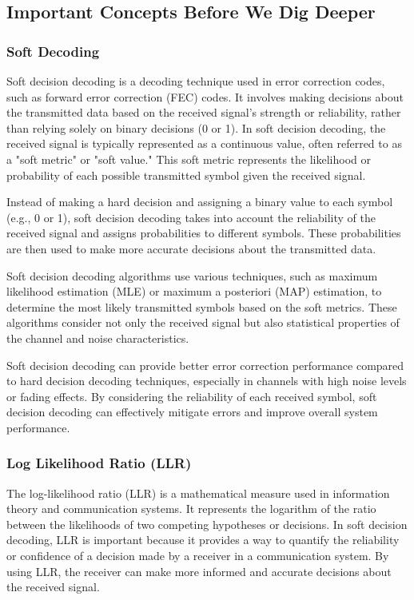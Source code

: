 \subsection{Important Concepts Before We Dig Deeper}
\subsubsection{Soft Decoding}
Soft decision decoding is a decoding technique used in error correction codes, such as forward error correction (FEC) codes. It involves making decisions about the transmitted data based on the received signal's strength or reliability, rather than relying solely on binary decisions (0 or 1).
In soft decision decoding, the received signal is typically represented as a continuous value, often referred to as a "soft metric" or "soft value." This soft metric represents the likelihood or probability of each possible transmitted symbol given the received signal.

Instead of making a hard decision and assigning a binary value to each symbol (e.g., 0 or 1), soft decision decoding takes into account the reliability of the received signal and assigns probabilities to different symbols. These probabilities are then used to make more accurate decisions about the transmitted data.

Soft decision decoding algorithms use various techniques, such as maximum likelihood estimation (MLE) or maximum a posteriori (MAP) estimation, to determine the most likely transmitted symbols based on the soft metrics. These algorithms consider not only the received signal but also statistical properties of the channel and noise characteristics.

Soft decision decoding can provide better error correction performance compared to hard decision decoding techniques, especially in channels with high noise levels or fading effects. By considering the reliability of each received symbol, soft decision decoding can effectively mitigate errors and improve overall system performance.

\subsubsection{Log Likelihood Ratio (LLR)}
The log-likelihood ratio (LLR) is a mathematical measure used in information theory and communication systems. It represents the logarithm of the ratio between the likelihoods of two competing hypotheses or decisions.
In soft decision decoding, LLR is important because it provides a way to quantify the reliability or confidence of a decision made by a receiver in a communication system. By using LLR, the receiver can make more informed and accurate decisions about the received signal.


